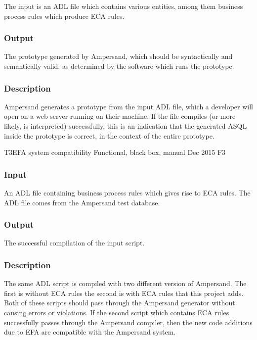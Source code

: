 \documentclass[12pt]{report}
\begin{document}
The input is an ADL file which contains various entities, among them business
process rules which produce ECA rules.

\vspace{-12pt}\subsubsection*{Output}

The prototype generated by Ampersand, which should be syntactically and
semantically valid, as determined by the software which runs the prototype.

\vspace{-12pt}\subsubsection*{Description}

Ampersand generates a prototype from the input ADL file, which a developer will
open on a web server running on their machine. If the file compiles (or more
likely, is interpreted) successfully, this is an indication that the generated
ASQL inside the prototype is correct, in the context of the entire prototype. 



\systemTest
{T3}{EFA system compatibility}
{Functional, black box, manual}
{Dec 2015}
{F3}
\vspace{-12pt}\subsubsection*{Input}
An ADL file containing business process rules which gives rise to ECA rules. 
The ADL file comes from the Ampersand test database. 

\vspace{-12pt}\subsubsection*{Output}
The successful compilation of the input script.
	
\vspace{-12pt}\subsubsection*{Description}
The same ADL script is compiled with two different version of Ampersand.  The
first is without ECA rules the second is with ECA rules that this project
adds. Both of these scripts should pass through the Ampersand generator without
causing errors or violations. If the second script which contains ECA rules
successfully passes through the Ampersand compiler, then the new code additions
due to EFA are compatible with the Ampersand system.
\end{document}

